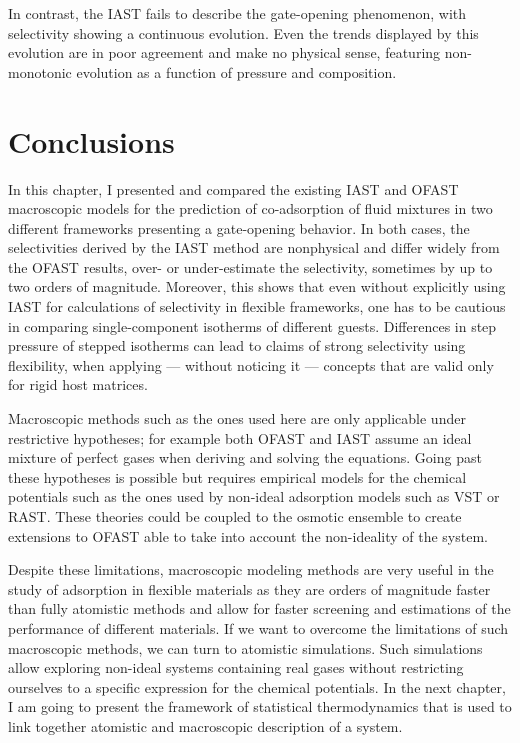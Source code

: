 \documentclass[thesis]{subfiles}
\begin{document}
In contrast, the IAST fails to describe the gate-opening phenomenon, with
selectivity showing a continuous evolution. Even the trends displayed by this
evolution are in poor agreement and make no physical sense, featuring
non-monotonic evolution as a function of pressure and composition.

\FloatBarrier
\newpage
\section*{Conclusions}

In this chapter, I presented and compared the existing IAST and OFAST
macroscopic models for the prediction of co-adsorption of fluid mixtures in two
different frameworks presenting a gate-opening behavior. In both cases, the
selectivities derived by the IAST method are nonphysical and differ widely from
the OFAST results, over- or under-estimate the selectivity, sometimes by up to
two orders of magnitude. Moreover, this shows that even without explicitly using
IAST for calculations of selectivity in flexible frameworks, one has to be
cautious in comparing single-component isotherms of different guests.
Differences in step pressure of stepped isotherms can lead to claims of strong
selectivity using flexibility, when applying --- without noticing it ---
concepts that are valid only for rigid host matrices.

Macroscopic methods such as the ones used here are only applicable under
restrictive hypotheses; for example both OFAST and IAST assume an ideal mixture
of perfect gases when deriving and solving the equations. Going past these
hypotheses is possible but requires empirical models for the chemical potentials
such as the ones used by non-ideal adsorption models such as VST or RAST. These
theories could be coupled to the osmotic ensemble to create extensions to OFAST
able to take into account the non-ideality of the system.

Despite these limitations, macroscopic modeling methods are very useful in the
study of adsorption in flexible materials as they are orders of magnitude faster
than fully atomistic methods and allow for faster screening and estimations of
the performance of different materials. If we want to overcome the limitations
of such macroscopic methods, we can turn to atomistic simulations. Such
simulations allow exploring non-ideal systems containing real gases without
restricting ourselves to a specific expression for the chemical potentials. In
the next chapter, I am going to present the framework of statistical
thermodynamics that is used to link together atomistic and macroscopic
description of a system.

\OnlyInSubfile{\printglobalbibliography}
\end{document}
